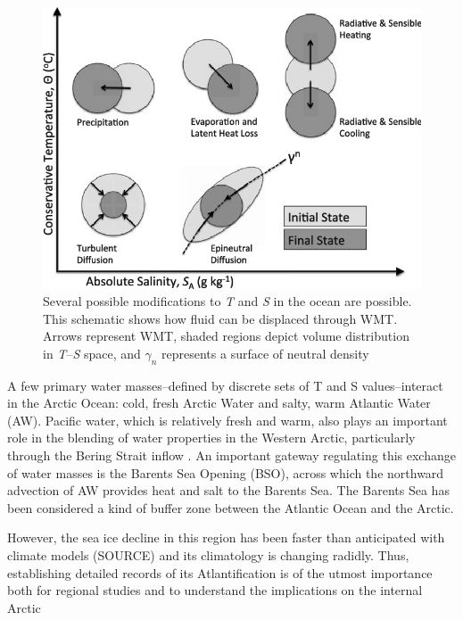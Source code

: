 \documentclass[a4paper,12pt]{article}
\begin{document}
    \begin{figure}[ht]
    \centerline{
    \includegraphics[width=\linewidth]{../figures/groeskamp_schematic.png}
    }
    \caption{Several possible modifications to \emph{T} and \emph{S} in the ocean are possible. This schematic shows how fluid can be displaced through WMT. Arrows represent WMT, shaded regions depict volume distribution in \emph{T}--\emph{S} space, and $\gamma_n$ represents a surface of neutral density \cite{Groeskamp2014}}
    \label{fig:groeskamp}
    \end{figure}
   

    A few primary water masses--defined by discrete sets of T and S values--interact in the Arctic Ocean: cold, fresh Arctic Water and salty, warm Atlantic Water (AW). Pacific water, which is relatively fresh and warm, also plays an important role in the blending of water properties in the Western Arctic, particularly through the Bering Strait inflow \cite{Haine2015}. An important gateway regulating this exchange of water masses is the Barents Sea Opening (BSO), across which the northward advection of AW provides heat and salt to the Barents Sea. The Barents Sea has been considered a kind of buffer zone between the Atlantic Ocean and the Arctic.

    However, the sea ice decline in this region has been faster than anticipated with climate models (SOURCE) and its climatology is changing radidly. Thus, establishing detailed records of its Atlantification is of the utmost importance both for regional studies and to understand the implications on the internal Arctic
    
\end{document}
